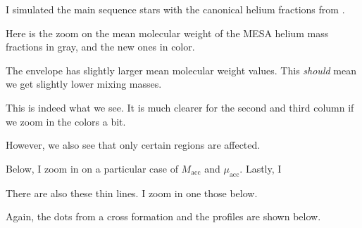 \documentclass[a4paper,10pt]{article}
\begin{document}
I simulated the main sequence stars with the canonical helium fractions from \citet{karakas2014}.

Here is the zoom on the mean molecular weight of the MESA helium mass fractions in gray,
and the new ones in color.

\begin{figure}[ht]
	\centering
\end{figure}

The envelope has slightly larger mean molecular weight values.
This \emph{should} mean we get slightly lower mixing masses.

\begin{figure}[ht]
	\centering
\end{figure}

This is indeed what we see.
It is much clearer for the second and third column if we zoom in the colors a bit.

\begin{figure}[ht]
	\centering
\end{figure}

However, we also see that only certain regions are affected.

Below, I zoom in on a particular case of \(M_\text{acc}\) and \(\mu_\text{acc}\).
Lastly, I
\begin{figure}[ht]
	\centering
\end{figure}

\begin{figure}[ht]
	\centering
\end{figure}
\nextpage

There are also these thin lines.
I zoom in one those below.
\begin{figure}[ht]
	\centering
\end{figure}

Again, the dots from a cross formation and the profiles are shown below.

\begin{figure}[ht]
	\centering
\end{figure}
\end{document}
